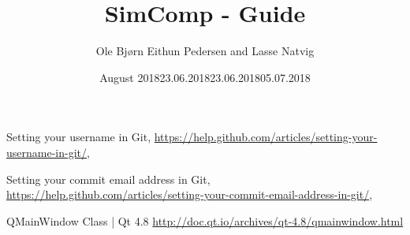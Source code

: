 \documentclass{article}
\title{SimComp - Guide}
\author{Ole Bjørn Eithun Pedersen and Lasse Natvig}
\date{August 2018}
\begin{document}
\maketitle
\tableofcontents
\newpage



\newpage






\begin{thebibliography}{9}
\label{username}
  Setting your username in Git, \url{https://help.github.com/articles/setting-your-username-in-git/}, \date{23.06.2018}
\label{email}
    Setting your commit email address in Git, \url{https://help.github.com/articles/setting-your-commit-email-address-in-git/}, \date{23.06.2018}
\label{qmainwindow}
    QMainWindow Class | Qt 4.8
    \url{http://doc.qt.io/archives/qt-4.8/qmainwindow.html}
    \date{05.07.2018}
\end{thebibliography}
\end{document}
